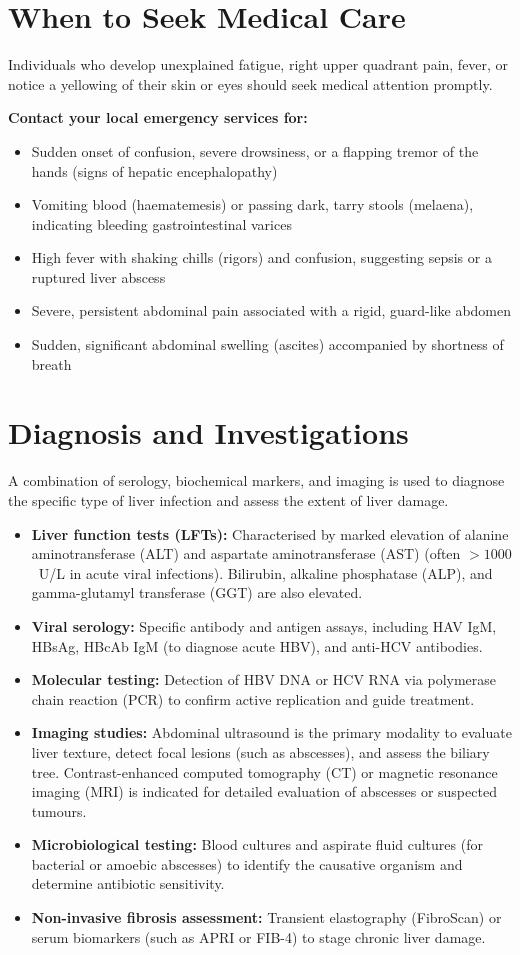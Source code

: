 \section*{When to Seek Medical Care}
Individuals who develop unexplained fatigue, right upper quadrant pain, fever, or notice a yellowing of their skin or eyes should seek medical attention promptly.

\textbf{Contact your local emergency services for:}
\begin{itemize}
    \item Sudden onset of confusion, severe drowsiness, or a flapping tremor of the hands (signs of hepatic encephalopathy)
    \item Vomiting blood (haematemesis) or passing dark, tarry stools (melaena), indicating bleeding gastrointestinal varices
    \item High fever with shaking chills (rigors) and confusion, suggesting sepsis or a ruptured liver abscess
    \item Severe, persistent abdominal pain associated with a rigid, guard-like abdomen
    \item Sudden, significant abdominal swelling (ascites) accompanied by shortness of breath
\end{itemize}

\section*{Diagnosis and Investigations}
A combination of serology, biochemical markers, and imaging is used to diagnose the specific type of liver infection and assess the extent of liver damage.
\begin{itemize}
    \item \textbf{Liver function tests (LFTs):} Characterised by marked elevation of alanine aminotransferase (ALT) and aspartate aminotransferase (AST) (often $>1000$~U/L in acute viral infections). Bilirubin, alkaline phosphatase (ALP), and gamma-glutamyl transferase (GGT) are also elevated.
    \item \textbf{Viral serology:} Specific antibody and antigen assays, including HAV IgM, HBsAg, HBcAb IgM (to diagnose acute HBV), and anti-HCV antibodies.
    \item \textbf{Molecular testing:} Detection of HBV DNA or HCV RNA via polymerase chain reaction (PCR) to confirm active replication and guide treatment.
    \item \textbf{Imaging studies:} Abdominal ultrasound is the primary modality to evaluate liver texture, detect focal lesions (such as abscesses), and assess the biliary tree. Contrast-enhanced computed tomography (CT) or magnetic resonance imaging (MRI) is indicated for detailed evaluation of abscesses or suspected tumours.
    \item \textbf{Microbiological testing:} Blood cultures and aspirate fluid cultures (for bacterial or amoebic abscesses) to identify the causative organism and determine antibiotic sensitivity.
    \item \textbf{Non-invasive fibrosis assessment:} Transient elastography (FibroScan) or serum biomarkers (such as APRI or FIB-4) to stage chronic liver damage.
\end{itemize}

